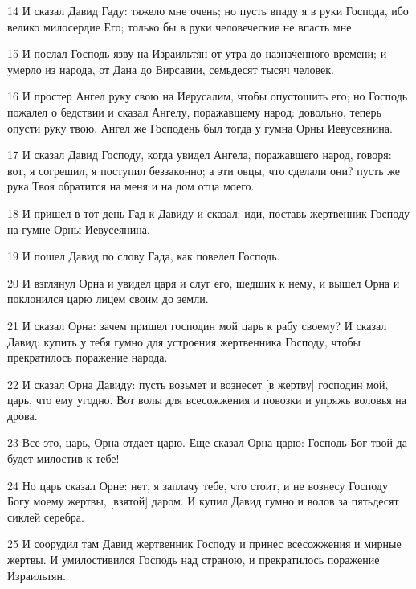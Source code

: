 \par 14 И сказал Давид Гаду: тяжело мне очень; но пусть впаду я в руки Господа, ибо велико милосердие Его; только бы в руки человеческие не впасть мне.
\par 15 И послал Господь язву на Израильтян от утра до назначенного времени; и умерло из народа, от Дана до Вирсавии, семьдесят тысяч человек.
\par 16 И простер Ангел руку свою на Иерусалим, чтобы опустошить его; но Господь пожалел о бедствии и сказал Ангелу, поражавшему народ: довольно, теперь опусти руку твою. Ангел же Господень был тогда у гумна Орны Иевусеянина.
\par 17 И сказал Давид Господу, когда увидел Ангела, поражавшего народ, говоря: вот, я согрешил, я поступил беззаконно; а эти овцы, что сделали они? пусть же рука Твоя обратится на меня и на дом отца моего.
\par 18 И пришел в тот день Гад к Давиду и сказал: иди, поставь жертвенник Господу на гумне Орны Иевусеянина.
\par 19 И пошел Давид по слову Гада, как повелел Господь.
\par 20 И взглянул Орна и увидел царя и слуг его, шедших к нему, и вышел Орна и поклонился царю лицем своим до земли.
\par 21 И сказал Орна: зачем пришел господин мой царь к рабу своему? И сказал Давид: купить у тебя гумно для устроения жертвенника Господу, чтобы прекратилось поражение народа.
\par 22 И сказал Орна Давиду: пусть возьмет и вознесет [в жертву] господин мой, царь, что ему угодно. Вот волы для всесожжения и повозки и упряжь воловья на дрова.
\par 23 Все это, царь, Орна отдает царю. Еще сказал Орна царю: Господь Бог твой да будет милостив к тебе!
\par 24 Но царь сказал Орне: нет, я заплачу тебе, что стоит, и не вознесу Господу Богу моему жертвы, [взятой] даром. И купил Давид гумно и волов за пятьдесят сиклей серебра.
\par 25 И соорудил там Давид жертвенник Господу и принес всесожжения и мирные жертвы. И умилостивился Господь над страною, и прекратилось поражение Израильтян.


